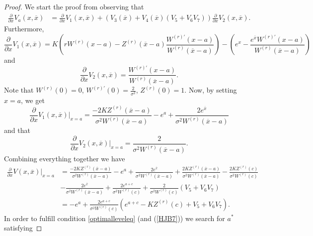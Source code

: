 \documentclass[10pt,a4paper]{amsart}
\begin{document}
		\begin{proof}
			We start the proof from observing that
			\begin{align*}
				\frac{\partial}{\partial x} V_a(x, \overline{x})%
				&= \frac{\partial}{\partial x} V_1(x, \overline{x}) + (V_3(\overline{x}) +  V_4(\overline{x})( V_5 + V_6 V_7 ) )\frac{\partial}{\partial x} V_2(x, \overline{x}).
			\end{align*}
			Furthermore,
			\begin{equation*}
				\frac{\partial}{\partial x} V_1(x, \overline{x})  = K\left( rW^{(r)}(x-a) - Z^{(r)}(\overline{x}-a)\frac{W^{(r)'}(x-a)}{W^{(r)}(\overline{x}-a)} \right) - \left( e^x - \frac{e^{\overline{x}}W^{(r)'}(x-a)}{W^{(r)}(\overline{x}-a)} \right)
			\end{equation*}
			and
			\begin{equation*}
				\frac{\partial}{\partial x} V_2(x, \overline{x})  = \frac{W^{(r)'}(x-a)}{W^{(r)}(\overline{x}-a)}.
			\end{equation*}
			Note that $W^{(r)}(0) = 0$, $W^{(r)'}(0) = \frac{2}{\sigma^2}$, $Z^{(r)}(0) = 1$. Now, by setting $x = a$, we get
			\begin{equation*}
				\frac{\partial}{\partial x} V_1(x, \overline{x})\big|_{x = a}  = \frac{-2K  Z^{(r)}(\overline{x}-a)}{\sigma^2W^{(r)}(\overline{x}-a)}  -  e^a + \frac{2e^{\overline{x}}}{\sigma^2W^{(r)}(\overline{x}-a)}
			\end{equation*}
			and that
			\begin{equation*}
				\frac{\partial}{\partial x} V_2(x, \overline{x})\big|_{x = a}  = \frac{2}{\sigma^2W^{(r)}(\overline{x}-a)}.
			\end{equation*}
			Combining everything together we have
			\begin{align*}
				\frac{\partial}{\partial x} V(x, \overline{x})\big|_{x = a}  &= \frac{-2K  Z^{(r)}(\overline{x}-a)}{\sigma^2W^{(r)}(\overline{x}-a)}  -  e^a + \frac{2e^{\overline{x}}}{\sigma^2W^{(r)}(\overline{x}-a)} +
				\frac{2K  Z^{(r)}(\overline{x}-a)}{\sigma^2W^{(r)}(\overline{x}-a)} - \frac{2KZ^{(r)}(c)}{\sigma^2W^{(r)}(c)} \\
				\nonumber & - \frac{2e^{\overline{x}}}{\sigma^2W^{(r)}(\overline{x}-a)} + \frac{2e^{a+c}}{\sigma^2W^{(r)}(c)} + \frac{2}{\sigma^2W^{(r)}(c)}(V_5 + V_6 V_7) \\
				\nonumber & = -e^a + \frac{2e^{a+c}}{\sigma^2W^{(r)}(c)}\left(e^{a+c} - KZ^{(r)}(c) + V_5 + V_6 V_7 \right).
			\end{align*}
			In order to fulfill condition \eqref{optimalleveleq} (and (\ref{HJB7})) we search for $a^*$ satisfying

\end{proof}
\end{document}
